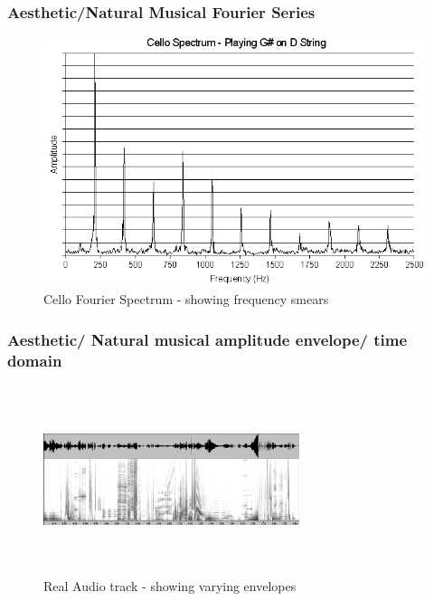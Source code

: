 \documentclass{beamer}
\begin{document}
\begin{frame}
	\frametitle{Aesthetic/Natural Musical Fourier Series}
		\begin{figure}[h]
		\centering
			\includegraphics[width=0.8\textheight]{images/cellospectrum.png}
		\caption{Cello Fourier Spectrum - showing frequency smears}
		\label{sg:fig:images_Genetic_Program_Tree}
	\end{figure}
	\end{frame}

\begin{frame}
	\frametitle{Aesthetic/ Natural musical amplitude envelope/ time domain }
		\begin{figure}[h]
		\centering
			\includegraphics[width=75mm, height= 55mm]{images/poemeSpec0.png}
		\caption{Real Audio track - showing varying envelopes}
		\label{sg:fig:images_Genetic_Program_Tree}
	\end{figure}
	\end{frame}
	

\end{document}
